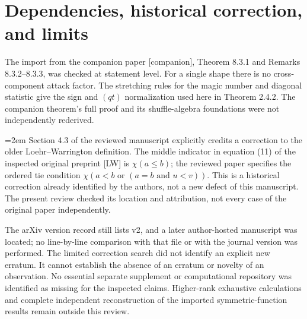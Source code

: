 \documentclass[10pt]{article}
\begin{document}
\section*{Dependencies, historical correction, and limits}
The import from the companion paper [companion], Theorem 8.3.1 and Remarks 8.3.2–8.3.3, was checked at statement level. For a single shape there is no cross-component attack factor. The stretching rules for the magic number and diagonal statistic give the sign and \((qt)\) normalization used here in Theorem 2.4.2. The companion theorem’s full proof and its shuffle-algebra foundations were not independently rederived.\par
=2em Section 4.3 of the reviewed manuscript explicitly credits a correction to the older Loehr–Warrington definition. The middle indicator in equation (11) of the inspected original preprint [LW] is \(\chi(a\leq b)\); the reviewed paper specifies the ordered tie condition \(\chi(a<b\text{ or }(a=b\text{ and }u<v))\). This is a historical correction already identified by the authors, not a new defect of this manuscript. The present review checked its location and attribution, not every case of the original paper independently.\par
The arXiv version record still lists v2, and a later author-hosted manuscript was located; no line-by-line comparison with that file or with the journal version was performed. The limited correction search did not identify an explicit new erratum. It cannot establish the absence of an erratum or novelty of an observation. No essential separate supplement or computational repository was identified as missing for the inspected claims. Higher-rank exhaustive calculations and complete independent reconstruction of the imported symmetric-function results remain outside this review.\par
\end{document}
